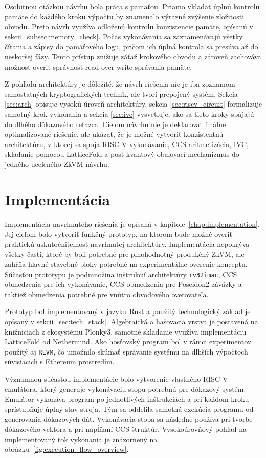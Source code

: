 Osobitnou otázkou návrhu bola práca s pamäťou. Priamo vkladať úplnú kontrolu
pamäte do každého kroku výpočtu by znamenalo výrazné zvýšenie zložitosti
obvodu. Preto návrh využíva odloženú kontrolu konzistencie pamäte, opísanú v
sekcii~\ref{subsec:memory_check}. Počas vykonávania sa zaznamenávajú všetky
čítania a zápisy do pamäťového logu, pričom ich úplná kontrola sa presúva až do
neskoršej fázy. Tento prístup znižuje záťaž krokového obvodu a zároveň zachováva
možnosť overiť správnosť read-over-write správania pamäte.

Z pohľadu architektúry je dôležité, že návrh riešenia nie je iba zoznamom
samostatných kryptografických techník, ale tvorí prepojený systém. Sekcia
\ref{sec:arch} opisuje vysokú úroveň architektúry, sekcia
\ref{sec:riscv_circuit} formalizuje samotný krok vykonania a sekcia
\ref{sec:ivc} vysvetľuje, ako sa tieto kroky spájajú do dlhého dôkazového
reťazca. Cieľom návrhu nie je deklarovať finálne optimalizované riešenie, ale
ukázať, že je možné vytvoriť konzistentnú architektúru, v ktorej sa spoja
RISC-V vykonávanie, CCS aritmetizácia, IVC, skladanie pomocou LatticeFold a
post-kvantový obaľovací mechanizmus do jedného uceleného ZkVM návrhu.

\section{Implementácia}

Implementácia navrhnutého riešenia je opísaná v kapitole~\ref{chap:implementation}.
Jej cieľom bolo vytvoriť funkčný prototyp, na ktorom bude možné overiť praktickú
uskutočniteľnosť navrhnutej architektúry. Implementácia nepokrýva všetky časti,
ktoré by boli potrebné pre plnohodnotný produkčný ZkVM, ale zahŕňa hlavné
stavebné bloky potrebné na experimentálne overenie konceptu. Súčasťou
prototypu je podmnožina inštrukcií architektúry \texttt{rv32imac}, CCS obmedzenia
pre ich vykonávanie, CCS obmedzenia pre Poseidon2 záväzky a taktiež
obmedzenia potrebné pre vnútro obvodového overovateľa.

Prototyp bol implementovaný v jazyku Rust a použitý technologický základ je
opísaný v sekcii~\ref{sec:tech_stack}. Algebraická a hašovacia vrstva je
postavená na knižniciach z ekosystému Plonky3, samotné skladanie využíva
implementáciu LatticeFold od Nethermind. Ako hosťovský program bol v
rámci experimentov použitý aj \texttt{REVM}, čo umožnilo skúmať správanie
systému na dlhších výpočtoch súvisiacich s Ethereum prostredím.

Významnou súčasťou implementácie bolo vytvorenie vlastného RISC-V
emulátora, ktorý generuje vykonávaciu stopu potrebnú pre dôkazový systém.
Emulátor vykonáva program po jednotlivých inštrukciách a pri každom kroku
sprístupňuje úplný stav stroja. Tým sa oddelila samotná exekúcia programu od
generovania dôkazových dát. Vykonávacia stopa sa následne používa pri tvorbe
dôkazového vektora a pri napĺňaní CCS štruktúr. Vysokoúrovňový pohľad na
implementovaný tok vykonania je znázornený na obrázku~\ref{fig:execution_flow_overview}.

